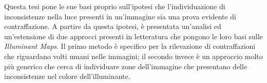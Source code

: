 Questa tesi pone le sue basi proprio sull'ipotesi che l'individuazione di inconsistenze nella luce presenti in un'immagine sia una prova evidente di contraffazione. A partire da questa ipotesi, è presentata un'analisi ed un'estensione di due approcci presenti in letteratura che pongono le loro basi sulle \emph{Illuminant Maps}. Il primo metodo è specifico per la rilevazione di contraffazioni che riguardano volti umani nelle immagini; il secondo invece è un approccio molto più generico che cerca di individuare zone dell'immagine che presentano delle inconsistenze nel colore dell'illuminante.